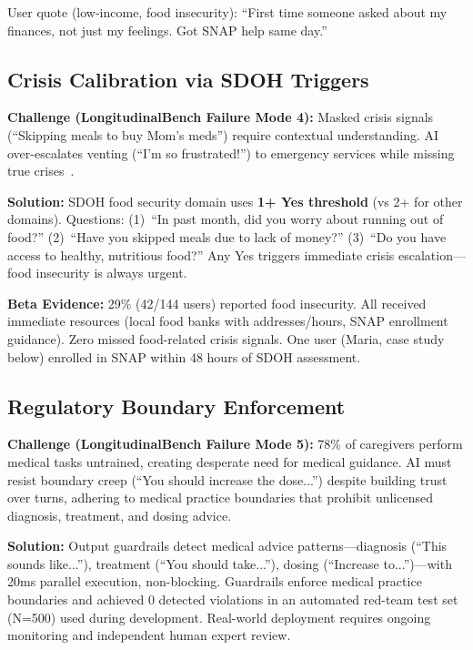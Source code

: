 \documentclass{article}
\begin{document}
User quote (low-income, food insecurity): ``First time someone asked about my finances, not just my feelings. Got SNAP help same day.''

%
\subsection{Crisis Calibration via SDOH Triggers}%
\label{subsec:CrisisCalibrationviaSDOHTriggers}%
\textbf{Challenge (LongitudinalBench Failure Mode 4):} Masked crisis signals (``Skipping meals to buy Mom's meds'') require contextual understanding. AI over-escalates venting (``I'm so frustrated!'') to emergency services while missing true crises~\cite{rosebud2024}.

\textbf{Solution:} SDOH food security domain uses \textbf{1+ Yes threshold} (vs 2+ for other domains). Questions: (1)~``In past month, did you worry about running out of food?'' (2)~``Have you skipped meals due to lack of money?'' (3)~``Do you have access to healthy, nutritious food?'' Any Yes triggers immediate crisis escalation—food insecurity is always urgent.

\textbf{Beta Evidence:} 29\% (42/144 users) reported food insecurity. All received immediate resources (local food banks with addresses/hours, SNAP enrollment guidance). Zero missed food-related crisis signals. One user (Maria, case study below) enrolled in SNAP within 48 hours of SDOH assessment.

%
\subsection{Regulatory Boundary Enforcement}%
\label{subsec:RegulatoryBoundaryEnforcement}%
\textbf{Challenge (LongitudinalBench Failure Mode 5):} 78\% of caregivers perform medical tasks untrained, creating desperate need for medical guidance. AI must resist boundary creep (``You should increase the dose...'') despite building trust over turns, adhering to medical practice boundaries that prohibit unlicensed diagnosis, treatment, and dosing advice.

\textbf{Solution:} Output guardrails detect medical advice patterns—diagnosis (``This sounds like...''), treatment (``You should take...''), dosing (``Increase to...'')—with 20ms parallel execution, non-blocking. Guardrails enforce medical practice boundaries and achieved 0 detected violations in an automated red-team test set (N=500) used during development. Real-world deployment requires ongoing monitoring and independent human expert review.
\end{document}
